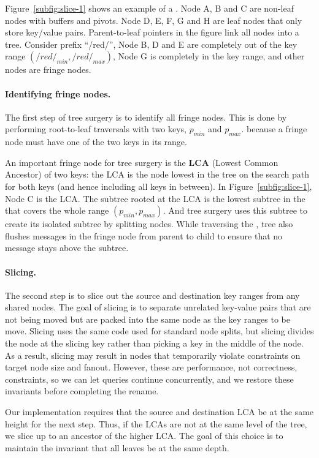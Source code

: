 Figure~\ref{subfig:slice-1} shows an example of a \bet.
Node A, B and C are non-leaf nodes with buffers and pivots.
Node D, E, F, G and H are leaf nodes that only store key/value pairs.
Parent-to-leaf pointers in the figure link all nodes into a tree.
Consider prefix ``/red/'',
Node B, D and E are completely out of the key range $(/red/_{min}, /red/_{max})$,
Node G is completely in the key range, and other nodes are fringe nodes.

\paragraph{Identifying fringe nodes.}
The first step of tree surgery is to identify all fringe nodes.
This is done by performing root-to-leaf traversals with two keys,
$p_{min}$ and $p_{max}$.
because a fringe node must have one of the two keys in its range.

An important fringe node for tree surgery is the \textbf{LCA}
(Lowest Common Ancestor) of two keys: the LCA is the \bet node lowest in the
tree on the search path for both keys (and hence including all keys in between).
In Figure~\ref{subfig:slice-1}, Node C is the LCA.
The subtree rooted at the LCA is the lowest subtree in the \bet that covers
the whole range $(p_{min}, p_{max})$.
And tree surgery uses this subtree to create its isolated subtree by splitting
nodes.
While traversing the \bet, tree also flushes messages in the fringe node from
parent to child to ensure that no message stays above the subtree.

\paragraph{Slicing.}
The second step is to slice out the source and destination
key ranges from any shared nodes.
The goal of slicing is to separate unrelated key-value pairs that are not being
moved but are packed into the same \bet node as the key ranges to be move.
Slicing uses the same  code used for standard \bet node splits, but slicing
divides the node at the slicing key rather than picking a key in the middle of
the node.
As a result, slicing may result in nodes that temporarily violate constraints on
target node size and fanout.
However, these are performance, not correctness, constraints, so we can let
queries continue concurrently, and we restore these invariants before completing
the rename.

Our implementation requires that the source and destination LCA be at the same
height for the next step.
Thus, if the LCAs are not at the same level of the tree, we slice up to an
ancestor of the higher LCA.
The goal of this choice is to maintain the invariant that all \bet leaves be
at the same depth.

